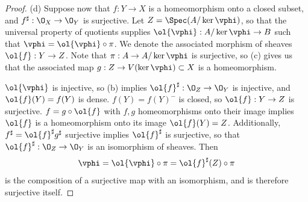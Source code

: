 \documentclass[12pt]{amsart}
\begin{document}
\begin{proof}
  (d) Suppose now that $f:Y\to X$ is a homeomorphism onto a closed subset, and $f^\sharp:\O_X\to\O_Y$ is surjective.
  Let $Z=\Spec(A/\ker \vphi)$, so that the universal property of quotients supplies $\ol{\vphi}:A/\ker\vphi\to B$ such that $\vphi = \ol{\vphi}\circ \pi$.
  We denote the associated morphism of sheaves $\ol{f}:Y\to Z$.
  Note that $\pi:A\to A/\ker\vphi$ is surjective, so (c) gives us that the associated map $g:Z\to V(\ker\vphi)\subset X$ is a homeomorphism.

  $\ol{\vphi}$ is injective, so (b) implies $\ol{f}^\sharp:\O_Z\to \O_Y$ is injective, and $\ol{f}(Y)=f(Y)$ is dense.
  $f(Y)=f(Y)^-$ is closed, so $\ol{f}:Y\to Z$ is surjective.
  $f = g\circ \ol{f}$ with $f,g$ homeomorphisms onto their image implies $\ol{f}$ is a homeomorphism onto its image $\ol{f}(Y)=Z$.
  Additionally, $f^\sharp = \ol{f}^\sharp g^\sharp$ surjective implies $\ol{f}^\sharp$ is surjective, so that $\ol{f}^\sharp:\O_Z\to \O_Y$ is an isomorphism of sheaves.
  Then 
  \[
    \vphi =\ol{\vphi}\circ \pi = \ol{f}^\sharp(Z)\circ \pi
  \]
  is the composition of a surjective map with an isomorphism, and is therefore surjective itself.
\end{proof}


% 
% 
% 
% 
% 
\end{document}
